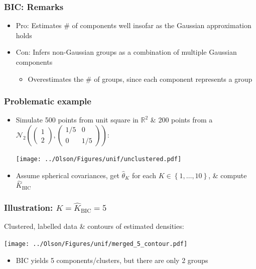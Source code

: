 \documentclass[mathserif,compress]{beamer}
\newcommand*\reals{\mathbb{R}}
\newcommand*\set[1]{\left\{#1\right\}}
\newcommand*\estim[1]{\widehat{#1}}
\renewcommand\;{\,}
\begin{document}
\begin{frame}\frametitle{BIC: Remarks}
\begin{itemize}
\item[]
\alert{Pro:} Estimates \# of components well insofar as the Gaussian approximation holds
\bigskip
\item[]
\alert{Con:} Infers non-Gaussian groups as a combination of multiple Gaussian components
\begin{itemize}
\bigskip
\item
Overestimates the \# of groups, since each component represents a group
\end{itemize}
\end{itemize}

\end{frame}

\begin{frame}\frametitle{Problematic example}
\begin{itemize}
\item[]
Simulate 500 points from unit square in $\reals^2$ \& 200 points from a 
$\mathcal N_2\left(\begin{pmatrix} 1 \\ 2 \end{pmatrix},
	\begin{pmatrix} 1/5 & 0 \\ 0 & 1/5 \end{pmatrix}\right)$:
\begin{center}
\texttt{[image: ../Olson/Figures/unif/unclustered.pdf]}
\end{center}
\item[]
Assume spherical covariances, get $\estim\theta_K$  for each $K \in \set{1, \dotsc, 10}$, \& compute $\estim K_\text{BIC}$
\end{itemize}
\end{frame}

\begin{frame}\frametitle{Illustration: $K = \estim K_\text{BIC} = 5$}
Clustered, labelled data \& contours of estimated densities:
\begin{center}
\texttt{[image: ../Olson/Figures/unif/merged\_5\_contour.pdf]}
\end{center}
\begin{itemize}
\item
BIC yields 5 components/clusters, but there are only 2 groups
\end{itemize}
\end{frame}
\end{document}
